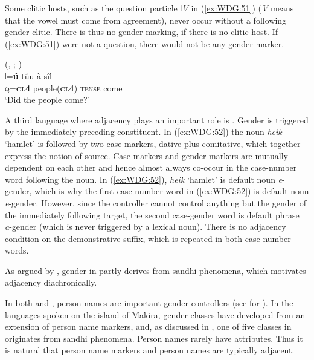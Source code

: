 \documentclass[output=collectionpaper]{langsci/langscibook}
\begin{document}
Some clitic hosts, such as the question particle \textit{ǀV} in (\ref{ex:WDG:51}) (\textit{V} means that the vowel must come from agreement), never occur without a following gender clitic. There is thus no gender marking, if there is no clitic host. If (\ref{ex:WDG:51}) were not a question, there would not be any gender marker.

\ea\label{ex:WDG:51}
 (, ; \citealt[18]{Traill1994})\\
\gll	ǀ=\textbf{ú}	tûu	à	sîl\\
	\textsc{q=\textbf{cl4}}	people(\textbf{\textsc{cl4}})	\textsc{tense}	come\\
\glt	`Did the people come?'\\
\z


A third language where adjacency plays an important role is . Gender is triggered by the immediately preceding constituent. In (\ref{ex:WDG:52}) the noun \textit{heik} `hamlet' is followed by two case markers, dative plus comitative, which together express the notion of source. Case markers and gender markers are mutually dependent on each other and hence almost always co-occur in the case-number word following the noun. In (\ref{ex:WDG:52}), \textit{heik} `hamlet' is default noun \textit{e}-gender, which is why the first case-number word in (\ref{ex:WDG:52}) is default noun \textit{e}-gender. However, since the controller cannot control anything but the gender of the immediately following target, the second case-gender word is default phrase \textit{a}-gender (which is never triggered by a lexical noun). There is no adjacency condition on the demonstrative suffix, which is repeated in both case-number words.

%

As argued by \cite{Waelchli2018}, gender in  partly derives from sandhi phenomena, which motivates adjacency diachronically.

In both  and , person names are important gender controllers (see  for ). In the  languages spoken on the island of Makira, gender classes have developed from an extension of person name markers, and, as discussed in , one of five classes in  originates from sandhi phenomena. Person names rarely have attributes. Thus it is natural that person name markers and person names are typically adjacent.
\end{document}
